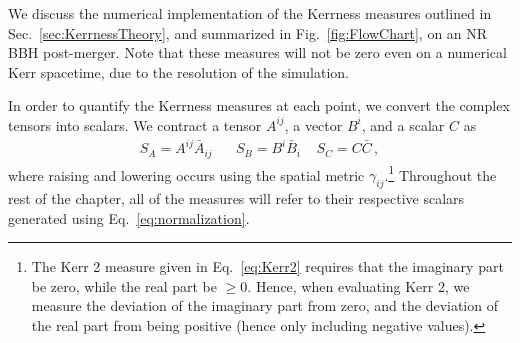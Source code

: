 We discuss the numerical implementation of the Kerrness measures outlined in Sec.~\ref{sec:KerrnessTheory}, and summarized in Fig.~\ref{fig:FlowChart}, on an NR BBH post-merger. Note that these measures will not be zero even on a numerical Kerr spacetime, due to the resolution of the simulation. 

\ConvergenceTestFigure


In order to quantify the Kerrness measures at each point, we convert the complex tensors into scalars. We contract a tensor $A^{ij}$, a vector $B^i$, and a scalar $C$ as
\begin{align}
\label{eq:normalization}
S_A = A^{ij}\bar{A}_{ij} \;\;\;\;\;\; S_B = B^{i}\bar{B}_i \;\;\;\; S_C = C\bar{C}\,,
\end{align} where raising and lowering occurs using the spatial metric $\gamma_{ij}$.\footnote{The Kerr 2 measure given in Eq.~\eqref{eq:Kerr2} requires that the imaginary part be zero, while the real part be $\geq 0$. Hence, when evaluating Kerr 2, we measure the deviation of the imaginary part from zero, and the deviation of the real part from being positive (hence only including negative values).} Throughout the rest of the chapter, all of the measures will refer to their respective scalars generated using Eq.~\eqref{eq:normalization}. 



